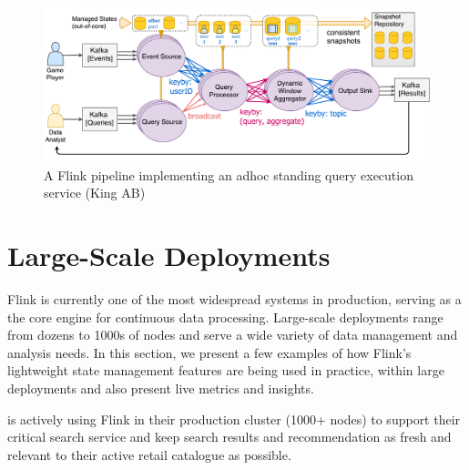 \begin{figure}[t]
\centering
\includegraphics[width=\textwidth]{figures/rbea.pdf}
\caption{A Flink pipeline implementing an adhoc standing query execution service (King AB)} 
\label{fig:rbea}
\vspace{-4mm}
\end{figure}

\section{Large-Scale Deployments}
\label{sec:evaluation}


Flink is currently one of the most widespread systems in production, serving as a the core engine for continuous data processing. Large-scale deployments range from dozens to 1000s of nodes and serve a wide variety of data management and analysis needs. In this section, we present a few examples of how Flink's lightweight state management features are being used in practice, within large deployments and also present live metrics and insights.


 is actively using Flink in their production cluster (1000+ nodes) to support their critical search service \cite{CUSTOM:web/alibaba} and keep search results and recommendation as fresh and relevant to their active retail catalogue as possible.





